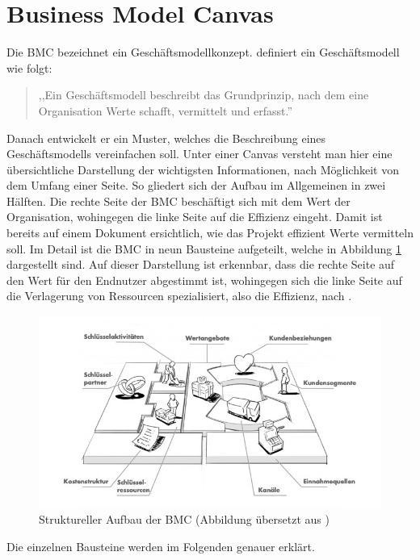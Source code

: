 \section{Business Model Canvas}
\label{BMC_Kapitel}
Die \ac{BMC} bezeichnet ein Geschäftsmodellkonzept.  definiert ein Geschäftsmodell wie folgt:
\begin{quote}
,,Ein Geschäftsmodell beschreibt das Grundprinzip, nach dem eine Organisation Werte schafft, vermittelt und erfasst.''
\end{quote}
Danach entwickelt er ein Muster, welches die Beschreibung eines Geschäftsmodells vereinfachen soll. Unter einer Canvas versteht man hier eine übersichtliche Darstellung der wichtigsten Informationen, nach Möglichkeit von dem Umfang einer Seite. So gliedert sich der Aufbau im Allgemeinen in zwei Hälften. Die rechte Seite der \ac{BMC} beschäftigt sich mit dem Wert der Organisation, wohingegen die linke Seite auf die Effizienz eingeht. Damit ist bereits auf einem Dokument ersichtlich, wie das Projekt effizient Werte vermitteln soll. Im Detail ist die \ac{BMC} in neun Bausteine aufgeteilt, welche in Abbildung \ref{fig:BMC_Structure} dargestellt sind. Auf dieser Darstellung ist erkennbar, dass die rechte Seite auf den Wert für den Endnutzer abgestimmt ist, wohingegen sich die linke Seite auf die Verlagerung von Ressourcen spezialisiert, also die Effizienz, nach \citeauthor{BusinessModelGeneration}. 
\begin{figure}
	\begin{center}
		\includegraphics[scale=0.5]{99_IMG/02_Grundlagen/bmcStructure.jpg}
		\caption[Struktureller Aufbau der \ac{BMC}]{Struktureller Aufbau der \ac{BMC} (Abbildung übersetzt aus )}
		\label{fig:BMC_Structure}
	\end{center}
\end{figure}
Die einzelnen Bausteine werden im Folgenden genauer erklärt.

